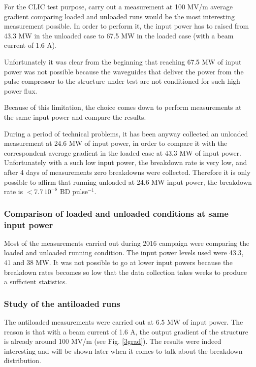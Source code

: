 For the CLIC test purpose,  carry out a measurement at 100 MV/m average gradient comparing loaded and unloaded runs would be the most interesting measurement possible. In order to perform it, the input power has to raised from 43.3 MW in the unloaded case to 67.5 MW in the loaded case (with a beam current of 1.6 A). 

Unfortunately it was clear from the beginning that reaching 67.5 MW of input power was not possible because the waveguides that deliver the power from the pulse compressor to the structure under test are not conditioned for such high power flux.

Because of this limitation, the choice comes down to perform measurements at the same input power and compare the results. 

During a period of technical problems, it has been anyway collected an unloaded measurement at 24.6 MW of input power, in order to compare it with the correspondent average gradient in the loaded case at 43.3 MW of input power. Unfortunately with a such low input power, the breakdown rate is very low, and after 4 days of measurements zero breakdowns were collected. Therefore it is only possible to affirm that running unloaded at 24.6 MW input power, the breakdown rate is $< 7.7 \, 10^{-8} $ BD pulse$^{-1}$. 


\subsubsection{Comparison of loaded and unloaded conditions at same input power}

Most of the measurements carried out during 2016 campaign were comparing the loaded and unloaded running condition. The input power levels used were 43.3, 41 and 38 MW. It was not possible to go at lower input powers because the breakdown rates becomes so low that the data collection takes weeks to produce a sufficient statistics.


\subsubsection{Study of the antiloaded runs}

The antiloaded measurements were carried out at 6.5 MW of input power. The reason is that with a beam current  of 1.6 A, the output gradient of the structure is already around 100 MV/m (see Fig. \ref{3grad}). The results were indeed interesting and will be shown later when it comes to talk about the breakdown distribution.




